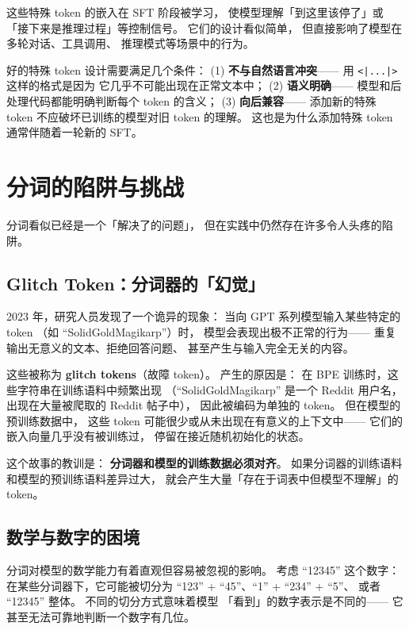 这些特殊 token 的嵌入在 SFT 阶段被学习，
使模型理解「到这里该停了」或
「接下来是推理过程」等控制信号。
它们的设计看似简单，
但直接影响了模型在多轮对话、工具调用、
推理模式等场景中的行为。

\begin{corebox}
好的特殊 token 设计需要满足几个条件：
(1) \textbf{不与自然语言冲突}——
用 \texttt{<|...|>} 这样的格式是因为
它几乎不可能出现在正常文本中；
(2) \textbf{语义明确}——
模型和后处理代码都能明确判断每个 token 的含义；
(3) \textbf{向后兼容}——
添加新的特殊 token 不应破坏已训练的模型对旧 token 的理解。
这也是为什么添加特殊 token 通常伴随着一轮新的 SFT。
\end{corebox}

\section{分词的陷阱与挑战}

分词看似已经是一个「解决了的问题」，
但在实践中仍然存在许多令人头疼的陷阱。

\subsection{Glitch Token：分词器的「幻觉」}

2023 年，研究人员发现了一个诡异的现象：
当向 GPT 系列模型输入某些特定的 token
（如 ``SolidGoldMagikarp''）时，
模型会表现出极不正常的行为——
重复输出无意义的文本、拒绝回答问题、
甚至产生与输入完全无关的内容。

这些被称为 \textbf{glitch tokens}（故障 token）。
产生的原因是：
在 BPE 训练时，这些字符串在训练语料中频繁出现
（``SolidGoldMagikarp'' 是一个 Reddit 用户名，
出现在大量被爬取的 Reddit 帖子中），
因此被编码为单独的 token。
但在模型的预训练数据中，
这些 token 可能很少或从未出现在有意义的上下文中——
它们的嵌入向量几乎没有被训练过，
停留在接近随机初始化的状态。

这个故事的教训是：
\textbf{分词器和模型的训练数据必须对齐}。
如果分词器的训练语料和模型的预训练语料差异过大，
就会产生大量「存在于词表中但模型不理解」的 token。

\subsection{数学与数字的困境}

分词对模型的数学能力有着直观但容易被忽视的影响。
考虑 ``12345'' 这个数字：
在某些分词器下，它可能被切分为
``123'' + ``45''、``1'' + ``234'' + ``5''、
或者 ``12345'' 整体。
不同的切分方式意味着模型
「看到」的数字表示是不同的——
它甚至无法可靠地判断一个数字有几位。

